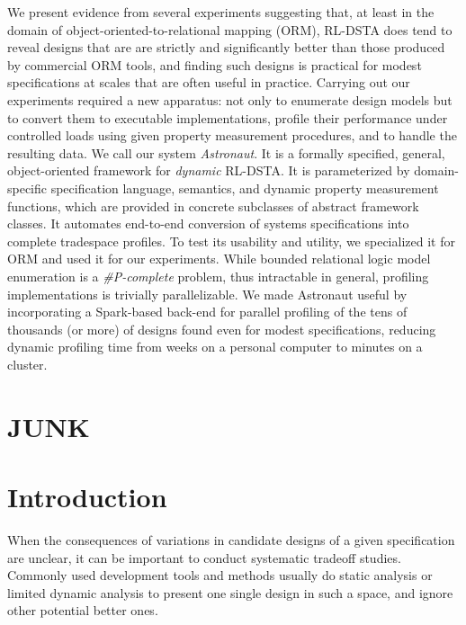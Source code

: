 We present evidence from several experiments suggesting that, at least in the domain of object-oriented-to-relational mapping (ORM), RL-DSTA does tend to reveal designs that are are strictly and significantly better than those produced by commercial ORM tools, and finding such designs is practical for modest specifications at scales that are often useful in practice. Carrying out our experiments required a new apparatus: not only to enumerate design models but to convert them to executable implementations, profile their performance under controlled loads using given property measurement procedures, and to handle the resulting data. We call our system {\em Astronaut}. It is a formally specified, general, object-oriented framework for {\em dynamic} RL-DSTA. It is parameterized by domain-specific specification language, semantics, and dynamic property measurement functions, which are provided in concrete subclasses of abstract framework classes. It automates end-to-end conversion of systems specifications into complete tradespace profiles. To test its usability and utility, we specialized it for ORM and used it for our experiments. While bounded relational logic model enumeration is a {\em \#P-complete} problem, thus intractable in general, profiling implementations is trivially parallelizable. We made Astronaut useful by incorporating a Spark-based back-end for parallel profiling of the tens of thousands (or more) of designs found even for modest specifications, reducing dynamic profiling time from weeks on a personal computer to minutes on a cluster.


\section{JUNK}


\section{Introduction}
When the consequences of variations in candidate designs of a given specification are unclear, it can be important to conduct systematic tradeoff studies. Commonly used development tools and methods usually do static analysis or limited dynamic analysis to present one single design in such a space, and ignore other potential better ones.


